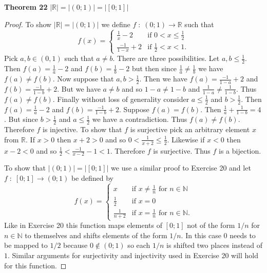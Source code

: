 \documentclass{article}
\begin{document}
\begin{flushleft}
\textbf{Theorem 22}
\textsl{$|\mathbb{R}|=|(0;1)|=|[0;1]|$}
\begin{proof}
To show $|\mathbb{R}|=|(0;1)|$ we define $f \; : \; (0;1) \rightarrow \mathbb{R}$ such that
\[
f(x) =
\begin{cases}
\frac{1}{x}-2 & \text{if } 0 < x \leq \frac{1}{2} \\
\frac{-1}{1-x}+2 & \text{if } \frac{1}{2}<x<1.
\end{cases}
\]
Pick $a,b \in (0,1)$ such that $a \neq b$. There are three possibilities. Let $a,b \leq \frac{1}{2}$. Then $f(a) = \frac{1}{a}-2$ and $f(b) = \frac{1}{b}-2$ but then since $\frac{1}{a} \neq \frac{1}{b}$ we have $f(a) \neq f(b)$. Now suppose that $a,b > \frac{1}{2}$. Then we have $f(a) = \frac{-1}{1-a}+2$ and $f(b) = \frac{-1}{1-b}+2$. But we have $a \neq b$ and so $1-a \neq 1-b$ and $\frac{1}{1-a} \neq \frac{1}{1-b}$. Thus $f(a) \neq f(b)$. Finally without loss of generality consider $a \leq \frac{1}{2}$ and $b > \frac{1}{2}$. Then $f(a) = \frac{1}{a}-2$ and $f(b) = \frac{-1}{1-b}+2$. Suppose $f(a)=f(b)$. Then $\frac{1}{a}+\frac{1}{1-b}=4$. But since $b > \frac{1}{2}$ and $a \leq \frac{1}{2}$ we have a contradiction. Thus $f(a) \neq f(b)$. Therefore $f$ is injective. To show that $f$ is surjective pick an arbitrary element $x$ from $\mathbb{R}$. If $x>0$ then $x+2>0$ and so $0<\frac{1}{x+2} \leq \frac{1}{2}$. Likewise if $x<0$ then $x-2<0$ and so $\frac{1}{2} < \frac{-1}{x-2}-1 < 1$. Therefore $f$ is surjective. Thus $f$ is a bijection.\newline

To show that $|(0;1)|=|[0;1]|$ we use a similar proof to Exercise 20 and let $f \; : \; [0;1] \rightarrow (0;1)$ be defined by
\[
f(x) =
\begin{cases}
x & \text{if $x \neq \frac{1}{n}$ for $n \in \mathbb{N}$} \\
\frac{1}{2} & \text{if $x = 0$} \\
\frac{1}{n+2} & \text{if $x=\frac{1}{n}$ for $n \in \mathbb{N}$}.
\end{cases}
\]
Like in Exercise 20 this function maps elements of $[0;1]$ not of the form $1/n$ for $n \in \mathbb{N}$ to themselves and shifts elements of the form $1/n$. In this case $0$ needs to be mapped to $1/2$ because $0 \notin (0;1)$ so each $1/n$ is shifted two places instead of $1$. Similar arguments for surjectivity and injectivity used in Exercise 20 will hold for this function.
\end{proof}


\end{flushleft}
\end{document}
